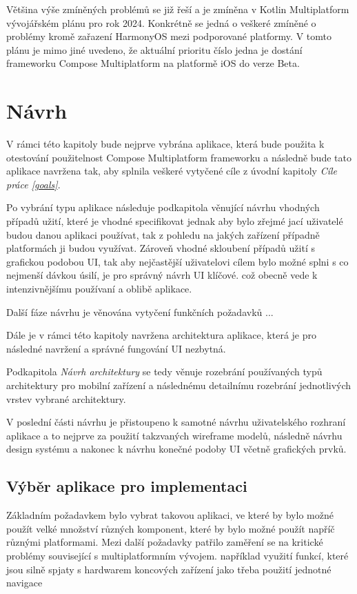 Většina výše zmíněných problémů se již řeší a je zmíněna v Kotlin Multiplatform vývojářském plánu pro rok 2024. \cite{KMPRoaddMap} Konkrétně
se jedná o veškeré zmíněné o problémy kromě zařazení HarmonyOS mezi podporované platformy.%
V tomto plánu je mimo jiné uvedeno, že aktuální prioritu číslo jedna je dostání frameworku Compose Multiplatform na platformě iOS do verze Beta. \cite{KMPRoaddMap}

\chapter{Návrh}
V rámci této kapitoly bude nejprve vybrána aplikace, která bude použita k otestování použitelnost Compose Multiplatform frameworku a následně
bude tato aplikace navržena tak, aby splnila veškeré vytyčené cíle z úvodní kapitoly \textit{Cíle práce \ref{goals}}.

Po vybrání typu aplikace následuje podkapitola věnující návrhu vhodných případů užití, které je vhodné specifikovat jednak aby bylo zřejmé jací 
uživatelé budou danou aplikaci používat, tak z pohledu na jakých zařízení případně platformách ji budou využívat. 
Zároveň vhodné skloubení případů užití s grafickou podobou UI, tak aby nejčastější uživatelovi cílem bylo možné splni s co nejmenší dávkou úsilí, 
je pro správný návrh UI klíčové. 
což obecně vede k intenzivnějšímu používaní a oblibě aplikace.


Další fáze návrhu je věnována vytyčení funkčních požadavků ...

Dále je v rámci této kapitoly navržena architektura aplikace, která je pro následné navržení a správné fungování UI nezbytná. 

Podkapitola \textit{Návrh architektury} se tedy věnuje rozebrání používaných typů architektury pro mobilní zařízení a následnému detailnímu
rozebrání jednotlivých vrstev vybrané architektury.

V poslední části návrhu je přistoupeno k samotné návrhu uživatelského rozhraní aplikace a to nejprve za použití takzvaných wireframe modelů,
následně návrhu design systému a nakonec k návrhu konečné podoby UI včetně grafických prvků.



\section{Výběr aplikace pro implementaci}
Základním požadavkem bylo vybrat takovou aplikaci, ve které by bylo možné použít velké množství různých komponent, 
které by bylo možné použít napříč různými platformami.
Mezi další požadavky patřilo zaměření se na kritické problémy související s multiplatformním vývojem. 
například využití funkcí, které jsou silně spjaty s hardwarem koncových zařízení jako třeba použití jednotné navigace

